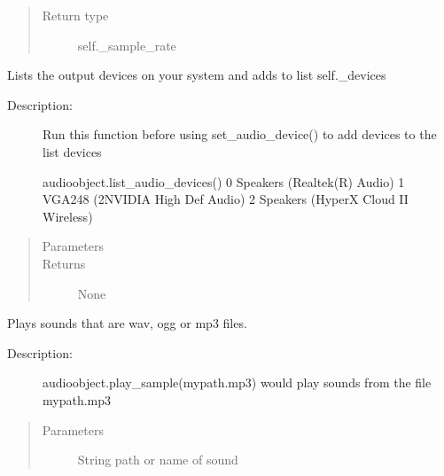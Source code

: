 \documentclass[letterpaper,10pt,english,openany,oneside]{sphinxmanual}
\begin{document}
\begin{fulllineitems}
\begin{fulllineitems}
\begin{quote}
\begin{description}
\item[{Return type}] \leavevmode
\sphinxAtStartPar
self.\_sample\_rate

\end{description}\end{quote}

\end{fulllineitems}



\begin{fulllineitems}
\sphinxAtStartPar
Lists the output devices on your system and adds to list self.\_devices
\begin{description}
\item[{Description:}] \leavevmode
\sphinxAtStartPar
Run this function before using set\_audio\_device() to add devices to the list devices

\sphinxAtStartPar
audioobject.list\_audio\_devices()
0 Speakers (Realtek(R) Audio)
1 VGA248 (2\sphinxhyphen{}NVIDIA High Def Audio)
2 Speakers (HyperX Cloud II Wireless)

\end{description}
\begin{quote}\begin{description}
\item[{Parameters}] \leavevmode
\sphinxAtStartPar
{} \textendash{} 

\item[{Returns}] \leavevmode
\sphinxAtStartPar
None

\end{description}\end{quote}

\end{fulllineitems}



\begin{fulllineitems}
\sphinxAtStartPar
Plays sounds that are wav, ogg or mp3 files.
\begin{description}
\item[{Description:}] \leavevmode
\sphinxAtStartPar
audioobject.play\_sample(mypath.mp3) would play sounds from the file mypath.mp3

\end{description}
\begin{quote}\begin{description}
\item[{Parameters}] \leavevmode
\sphinxAtStartPar
{} \textendash{} String path or name of sound


\end{description}
\end{quote}
\end{fulllineitems}
\end{fulllineitems}
\end{document}
